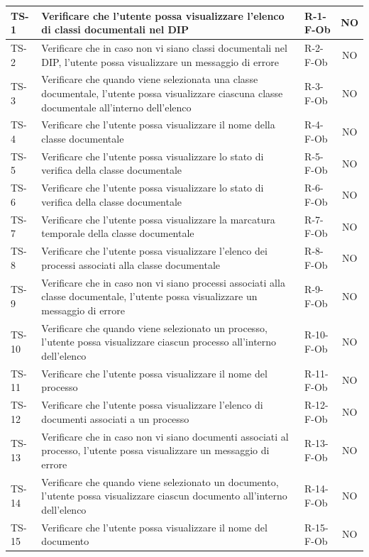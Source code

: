 \documentclass[a4paper,12pt]{article}
\begin{document}
\begin{longtable}{|p{1.5cm}|p{8.3cm}|p{2.4cm}|c|}
TS-1 & Verificare che l'utente possa visualizzare l'elenco di classi documentali nel DIP & R-1-F-Ob & NO \\
\hline
TS-2 & Verificare che in caso non vi siano classi documentali nel DIP, l'utente possa visualizzare un messaggio di errore & R-2-F-Ob & NO \\
\hline
TS-3 & Verificare che quando viene selezionata una classe documentale, l'utente possa visualizzare ciascuna classe documentale all'interno dell'elenco & R-3-F-Ob & NO \\
\hline
TS-4 & Verificare che l'utente possa visualizzare il nome della classe documentale & R-4-F-Ob & NO \\
\hline
TS-5 & Verificare che l'utente possa visualizzare lo stato di verifica della classe documentale & R-5-F-Ob & NO \\
\hline
TS-6 & Verificare che l'utente possa visualizzare lo stato di verifica della classe documentale & R-6-F-Ob & NO \\
\hline
TS-7 & Verificare che l'utente possa visualizzare la marcatura temporale della classe documentale & R-7-F-Ob & NO \\
\hline
TS-8 & Verificare che l'utente possa visualizzare l'elenco dei processi associati alla classe documentale & R-8-F-Ob & NO \\
\hline
TS-9 & Verificare che in caso non vi siano processi associati alla classe documentale, l'utente possa visualizzare un messaggio di errore & R-9-F-Ob & NO \\
\hline
TS-10 & Verificare che quando viene selezionato un processo, l'utente possa visualizzare ciascun processo all'interno dell'elenco & R-10-F-Ob & NO \\
\hline
TS-11 & Verificare che l'utente possa visualizzare il nome del processo & R-11-F-Ob & NO \\
\hline
TS-12 & Verificare che l'utente possa visualizzare l'elenco di documenti associati a un processo & R-12-F-Ob & NO \\
\hline
TS-13 & Verificare che in caso non vi siano documenti associati al processo, l'utente possa visualizzare un messaggio di errore & R-13-F-Ob & NO \\
\hline
TS-14 & Verificare che quando viene selezionato un documento, l'utente possa visualizzare ciascun documento all'interno dell'elenco & R-14-F-Ob & NO \\
\hline
TS-15 & Verificare che l'utente possa visualizzare il nome del documento & R-15-F-Ob & NO \\

\end{longtable}
\end{document}
